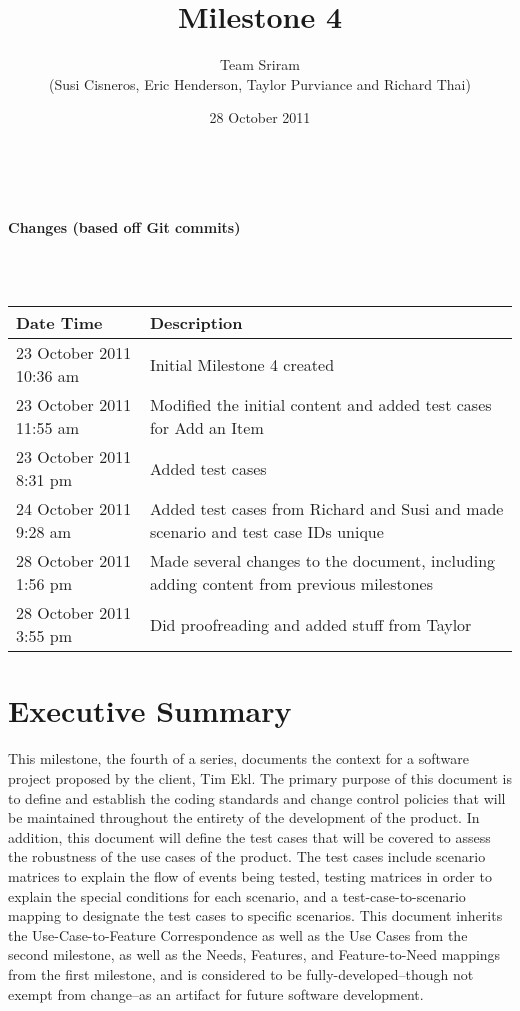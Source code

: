 \documentclass{article}
\begin{document}
\setlength{\voffset}{3.5in}
\title{Milestone 4}
\author{Team Sriram\\
(Susi Cisneros, Eric Henderson, Taylor Purviance and Richard Thai)}
\date{28 October 2011}
\maketitle
\clearpage
\setlength{\voffset}{0pt}
\tableofcontents
\clearpage
~\\
\begin{Large}\textbf{Changes (based off Git commits)}\end{Large}\\
~\\
\begin{tabular}{ | p{2in} | p{4.5in} | }
\hline
\textbf{Date Time} & \textbf{Description}\\
\hline
\hline
23 October 2011 10:36 am & Initial Milestone 4 created\\
\hline
23 October 2011 11:55 am & Modified the initial content and added test cases for Add an Item\\
\hline
23 October 2011 8:31 pm & Added test cases\\
\hline
24 October 2011 9:28 am & Added test cases from Richard and Susi and made scenario and test case IDs unique\\
\hline
28 October 2011 1:56 pm & Made several changes to the document, including adding content from previous milestones\\
\hline
28 October 2011 3:55 pm & Did proofreading and added stuff from Taylor\\
\hline
\end{tabular}
\clearpage
\section{Executive Summary}
This milestone, the fourth of a series, documents the context for a software project proposed by the client, Tim Ekl.  The primary purpose of this document is to define and establish the coding standards and change control policies that will be maintained throughout the entirety of the development of the product.  In addition, this document will define the test cases that will be covered to assess the robustness of the use cases of the product.  The test cases include scenario matrices to explain the flow of events being tested, testing matrices in order to explain the special conditions for each scenario, and a test-case-to-scenario mapping to designate the test cases to specific scenarios.  This document inherits  the Use-Case-to-Feature Correspondence as well as the Use Cases from the second milestone, as well as the Needs, Features, and Feature-to-Need mappings from the first milestone, and is considered to be fully-developed--though not exempt from change--as an artifact for future software development.
\end{document}
